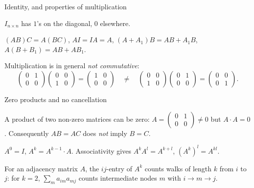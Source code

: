 \begin{frame}{Identity, and properties of multiplication}
\begin{definition}
$I_{n\times n}$ has $1$'s on the diagonal, $0$ elsewhere.
\end{definition}

\pause

\begin{theorem}
$(AB)C=A(BC)$, \quad $AI=IA=A$, \quad $(A+A_1)B=AB+A_1B$, \quad $A(B+B_1)=AB+AB_1$.
\end{theorem}

\pause

\begin{warning}
Multiplication is in general \emph{not commutative}:
\[
\left(\begin{smallmatrix} 0&1\\0&0\end{smallmatrix}\right)\left(\begin{smallmatrix} 0&0\\1&0\end{smallmatrix}\right) = \left(\begin{smallmatrix} 1&0\\0&0\end{smallmatrix}\right)
\quad\neq\quad
\left(\begin{smallmatrix} 0&0\\1&0\end{smallmatrix}\right)\left(\begin{smallmatrix} 0&1\\0&0\end{smallmatrix}\right) = \left(\begin{smallmatrix} 0&0\\0&1\end{smallmatrix}\right).
\]
\end{warning}
\end{frame}

\begin{frame}{Zero products and no cancellation}
\begin{warning}
A product of two non-zero matrices can be zero: $A=\left(\begin{smallmatrix} 0&1\\0&0\end{smallmatrix}\right)\neq 0$
but $A\cdot A=0$. Consequently $AB=AC$ does \emph{not} imply $B=C$.
\end{warning}

\pause

\begin{definition}[Powers]
$A^0=I$, $A^k=A^{k-1}\cdot A$. Associativity gives $A^kA^l=A^{k+l}$, $(A^k)^l=A^{kl}$.
\end{definition}

\pause

\begin{example}
For an adjacency matrix $A$, the $ij$-entry of $A^k$ counts walks of length $k$ from $i$ to $j$: for $k=2$,
$\sum_m a_{im}a_{mj}$ counts intermediate nodes $m$ with $i\to m\to j$.
\end{example}
\end{frame}

